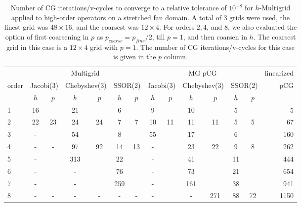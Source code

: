\begin{table}
  \caption{\label{tab:fan-aniso} Number of CG iterations/v-cycles to converge to a relative tolerance of $10^{-8}$ for $h$-Multigrid applied to high-order operators on a stretched fan domain. A total of 3 grids were used, the finest grid was $48\times 16$, and the coarsest was $12\times 4$. For orders $2,4$, and $8$, we also evaluated the option of first coarsening in $p$ as $p_{coarse} = p_{fine}/2$, till $p=1$, and then coarsen in $h$. The coarsest grid in this case is a $12\times 4$ grid with $p=1$. The number of CG iterations/v-cycles for this case is given in the $p$ column.}
		\centering
    \begin{tabular}{|l|c|c|c|c|c|c|c|c|c|c|c|c|r|} 
\hline
		        & \multicolumn{6}{c|}{Multigrid} & \multicolumn{6}{c|}{MG pCG} &          linearized \\
												 \cline{2-13}
					order &  \multicolumn{2}{c|}{\scriptsize  Jacobi(3)} &  \multicolumn{2}{c|}{\scriptsize Chebyshev(3)} & \multicolumn{2}{c|}{\scriptsize  SSOR(2)} & \multicolumn{2}{c|}{\scriptsize Jacobi(3)} &  \multicolumn{2}{c|}{\scriptsize Chebyshev(3)} & \multicolumn{2}{c|}{\scriptsize SSOR(2)} & pCG\\
		\hline
		 & $h$ & $p$ & $h$ & $p$& $h$ & $p$& $h$ & $p$& $h$ & $p$& $h$ & $p$& \\
		 \cline{2-13}
 1 &       16 &      &        21 &        &       6 &         &       9 &         &       10 &       &       5 &      & 5  \\
 2 &       22 &  23  &        24 &  24    &       7 &   7     &      10 &  11     &       11 &  11   &       5 &   5  & 67  \\
 3 &        - &      &        54 &        &       8 &         &      55 &         &       17 &       &       6 &      & 160  \\
 4 &        - &  -   &        97 &  92    &      14 &   13    &       - &         &       23 &  22   &       9 &   8  & 262  \\
 5 &        - &      &       313 &        &      22 &         &       - &         &       41 &       &      11 &      & 444  \\
 6 &        - &      &         - &        &      76 &         &       - &         &       73 &       &      21 &      & 654  \\
 7 &        - &      &         - &        &     259 &         &       - &         &      161 &       &      38 &      & 941  \\
 8 &        - &  -   &         - &  -     &       - &    -    &       - &         &        - & 271   &      88 &  72  & 1150  \\
\hline
	  \end{tabular}
\end{table}


